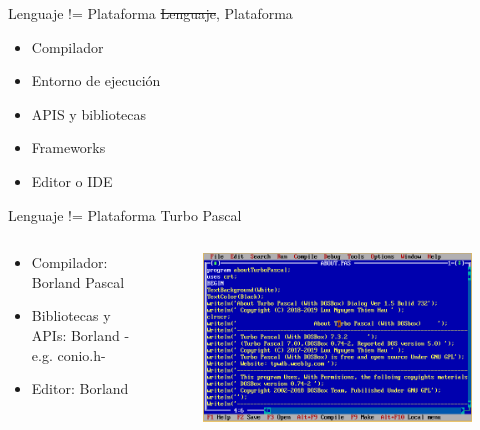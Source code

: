 \documentclass[aspectratio=169]{beamer}
\begin{document}
\begin{frame}{Lenguaje != Plataforma}
    \sout{Lenguaje}, Plataforma
	\begin{itemize}
	\item Compilador
    \item Entorno de ejecución
    \item APIS y bibliotecas
    \item Frameworks
    \item Editor o IDE
	\end{itemize}
\end{frame}

\begin{frame}{Lenguaje != Plataforma}
    Turbo Pascal

    \begin{columns}[T] %
	     \begin{column}[T]{0.5\textwidth} %
            \begin{itemize}
                \item Compilador: Borland Pascal
                \item Bibliotecas y APIs: Borland -e.g. conio.h-
                \item Editor: Borland
            \end{itemize}
	     \end{column}
	     \begin{column}[T]{7cm} %
   			\begin{figure}
   			\centering
   			\includegraphics[width=\linewidth]{Images/pascal}
   			\end{figure}

	     \end{column}
     \end{columns}
\end{frame}
\end{document}
